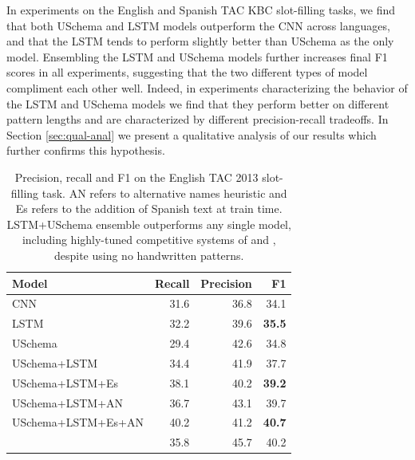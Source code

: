In experiments on the English and Spanish TAC KBC slot-filling tasks, we find that both USchema and LSTM models outperform the CNN across languages, and that the LSTM tends to perform slightly better than USchema as the only model. Ensembling the LSTM and USchema models further increases final F1 scores in all experiments, suggesting that the two different types of model compliment each other well. Indeed, in experiments characterizing the behavior of the LSTM and USchema models we find that they perform better on different pattern lengths and are characterized by different precision-recall tradeoffs. In Section \ref{sec:qual-anal} we present a qualitative analysis of our results which further confirms this hypothesis.


\begin{table}[t!]
\setlength{\tabcolsep}{4.1pt}
\begin{center}
\begin{tabular}{|lrrr|}
\hline
\bf Model & \bf Recall & \bf Precision & \bf F1 \\
\hline\hline
CNN                 & 31.6 & 36.8 & 34.1 \\
LSTM                & 32.2 & 39.6 & \bf 35.5  \\
USchema             & 29.4 & 42.6 & 34.8 \\
\hline\hline
USchema+LSTM        & 34.4 & 41.9 & 37.7 \\
USchema+LSTM+Es        & 38.1 & 40.2 & \bf 39.2 \\
\hline\hline
USchema+LSTM+AN	& 36.7 & 43.1 & 39.7 \\
USchema+LSTM+Es+AN & 40.2 & 41.2 & \bf 40.7 \\
\citet{roth2014relationfactory} & 35.8 & 45.7 & 40.2 \\

\hline
\end{tabular}
\caption{Precision, recall and F1 on the English TAC 2013 slot-filling task. AN refers to alternative names heuristic and Es refers to the addition of Spanish text at train time. LSTM+USchema ensemble outperforms any single model, including highly-tuned competitive systems of \protect\citet{roth2014relationfactory} and \protect\citet{angeli2014stanford}, despite using no handwritten patterns.  %
\label{en-tac-table}}
\end{center}
\end{table}

